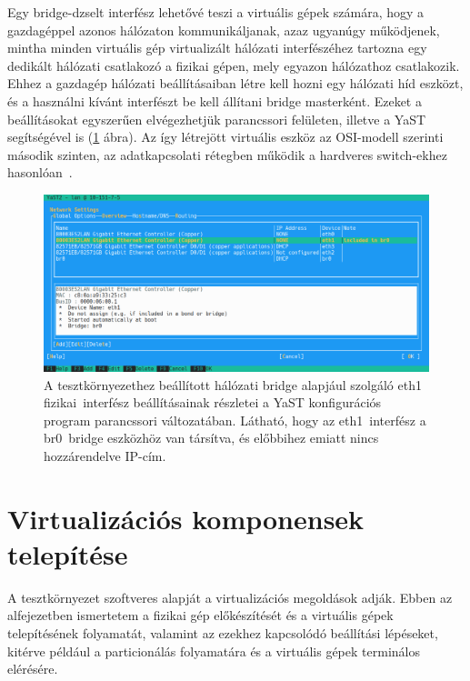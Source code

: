 Egy bridge-dzselt interfész lehetővé teszi a virtuális gépek számára, hogy a gazdagéppel azonos hálózaton kommunikáljanak, azaz ugyanúgy működjenek, mintha minden virtuális gép virtualizált hálózati interfészéhez tartozna egy dedikált hálózati csatlakozó a fizikai gépen, mely egyazon hálózathoz csatlakozik. Ehhez a gazdagép hálózati beállításaiban létre kell hozni egy hálózati híd eszközt, és a használni kívánt interfészt be kell állítani bridge masterként.
Ezeket a beállításokat egyszerűen elvégezhetjük parancssori felületen, illetve a YaST segítségével is (\ref{fig:yast-net-bridge} ábra). Az így létrejött virtuális eszköz az OSI-modell szerinti második szinten, az adatkapcsolati rétegben működik a hardveres switch-ekhez hasonlóan~\cite{SUSENetBridge}.

\begin{figure}[ht]
	\centering
	\includegraphics[width=15cm]{figures/yast-br0.png}
	\caption{A tesztkörnyezethez beállított hálózati bridge alapjául szolgáló eth1 fizikai~interfész beállításainak részletei a YaST konfigurációs program parancssori változatában. Látható, hogy az eth1~interfész a br0~bridge eszközhöz van társítva, és előbbihez emiatt nincs hozzárendelve IP-cím.}
	\label{fig:yast-net-bridge}
\end{figure}

\section{Virtualizációs komponensek telepítése}
A tesztkörnyezet szoftveres alapját a virtualizációs megoldások adják. Ebben az alfejezetben ismertetem a fizikai gép előkészítését és a virtuális gépek telepítésének folyamatát, valamint az ezekhez kapcsolódó beállítási lépéseket, kitérve például a particionálás folyamatára és a virtuális gépek terminálos elérésére.

